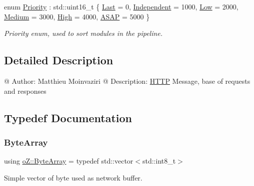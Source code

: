 \begin{DoxyCompactItemize}
enum \mbox{\hyperlink{namespaceo_z_af05a92eb185d18369e9b4acdcd9dcd12}{Priority}} \+: std\+::uint16\+\_\+t \{ \newline
\mbox{\hyperlink{namespaceo_z_af05a92eb185d18369e9b4acdcd9dcd12aa71d089139a7dea68f3de0ff29990bff}{Last}} = 0, 
\mbox{\hyperlink{namespaceo_z_af05a92eb185d18369e9b4acdcd9dcd12a0bf10abb7e9da477f36b2e69fdae8745}{Independent}} = 1000, 
\mbox{\hyperlink{namespaceo_z_af05a92eb185d18369e9b4acdcd9dcd12a44acd2d788f9e79eba46abcb3c006b0e}{Low}} = 2000, 
\mbox{\hyperlink{namespaceo_z_af05a92eb185d18369e9b4acdcd9dcd12a4e322bd010e5b70a4c4172c619a7e370}{Medium}} = 3000, 
\newline
\mbox{\hyperlink{namespaceo_z_af05a92eb185d18369e9b4acdcd9dcd12a7f08ba8e8aed8277432e0eba6cf9ffc2}{High}} = 4000, 
\mbox{\hyperlink{namespaceo_z_af05a92eb185d18369e9b4acdcd9dcd12a3e5081e5e70560fee15eb20b87662a69}{A\+S\+AP}} = 5000
 \}
\begin{DoxyCompactList}\small\item\em Priority enum, used to sort modules in the pipeline. \end{DoxyCompactList}\end{DoxyCompactItemize}


\subsection{Detailed Description}
@ Author\+: Matthieu Moinvaziri @ Description\+: \mbox{\hyperlink{namespaceo_z_1_1_h_t_t_p}{H\+T\+TP}} Message, base of requests and responses 

\subsection{Typedef Documentation}
\mbox{\label{namespaceo_z_abfa3f5a46e5c7584615dc1dd33fcafb6}} 
\subsubsection{\texorpdfstring{ByteArray}{ByteArray}}
{\footnotesize\ttfamily using \mbox{\hyperlink{namespaceo_z_abfa3f5a46e5c7584615dc1dd33fcafb6}{o\+Z\+::\+Byte\+Array}} = typedef std\+::vector$<$std\+::int8\+\_\+t$>$}



Simple vector of byte used as network buffer. 

\mbox{\label{namespaceo_z_acbfabf71824b5fc6a3beb64e397afc19}} 
